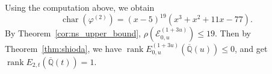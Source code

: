 \documentclass[a4paper]{jarticle} %
\theoremstyle{definition}
\theoremstyle{remark}
\DeclareMathOperator{\rank}{rank}
\DeclareMathOperator{\chara}{char}
\begin{document}
Using the computation above, we obtain
\begin{equation*}
    \chara(\varphi^{(2)}) = (x - 5)^{19}(x^{3} + x^{2} + 11 x - 77).
\end{equation*}
By Theorem~\ref{cor:ns_upper_bound}, $\rho(\mathcal{E}_{0,u}^{(1 + 3u)}) \leq 19$.
Then by Theorem~\ref{thm:shioda}, we have $\rank E_{0,u}^{(1 + 3u)}(\overline{\mathbb{Q}}(u)) \leq 0$, and get $\rank E_{2,t}(\overline{\mathbb{Q}}(t)) = 1$.

\printbibliography
\end{document}
